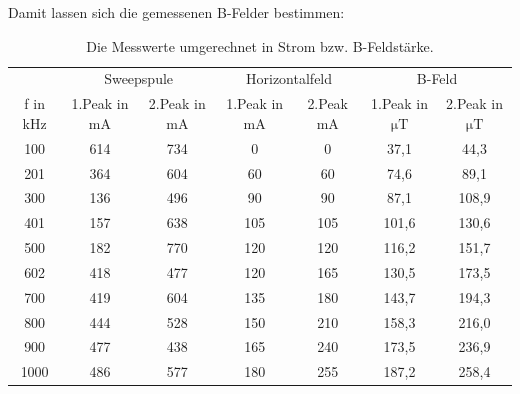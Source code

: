 \documentclass[
  bibliography=totoc,     %
  captions=tableheading,  %
  titlepage=firstiscover, %
]{scrartcl}
\begin{document}
\clearpage
\noindent
Damit lassen sich die gemessenen B-Felder bestimmen:
\begin{table}[H]
  \centering
  \caption{Die Messwerte umgerechnet in Strom bzw. B-Feldstärke.}
  \label{tab:3}
  \begin{tabular}{c c c c c c c}
    \toprule
    & \multicolumn{2}{c}{Sweepspule} & \multicolumn{2}{c}{Horizontalfeld} & \multicolumn{2}{c}{B-Feld}\\
    f in \si{\kilo\hertz} & 1.Peak in $\si{\milli\ampere}$ & 2.Peak in $\si{\milli\ampere}$ & 1.Peak in $\si{\milli\ampere}$ & 2.Peak $\si{\milli\ampere}$ & 1.Peak in $\si{\micro\tesla}$ & 2.Peak in $\si{\micro\tesla}$ \\
    \midrule
    100  & 614 & 734 &   0 &   0 &  37,1 &  44,3 \\
    201  & 364 & 604 &  60 &  60 &  74,6 &  89,1 \\
    300  & 136 & 496 &  90 &  90 &  87,1 & 108,9 \\
    401  & 157 & 638 & 105 & 105 & 101,6 & 130,6 \\
    500  & 182 & 770 & 120 & 120 & 116,2 & 151,7 \\
    602  & 418 & 477 & 120 & 165 & 130,5 & 173,5 \\
    700  & 419 & 604 & 135 & 180 & 143,7 & 194,3 \\
    800  & 444 & 528 & 150 & 210 & 158,3 & 216,0 \\
    900  & 477 & 438 & 165 & 240 & 173,5 & 236,9 \\
    1000 & 486 & 577 & 180 & 255 & 187,2 & 258,4 \\
    \bottomrule
  \end{tabular}
\end{table}
\end{document}
